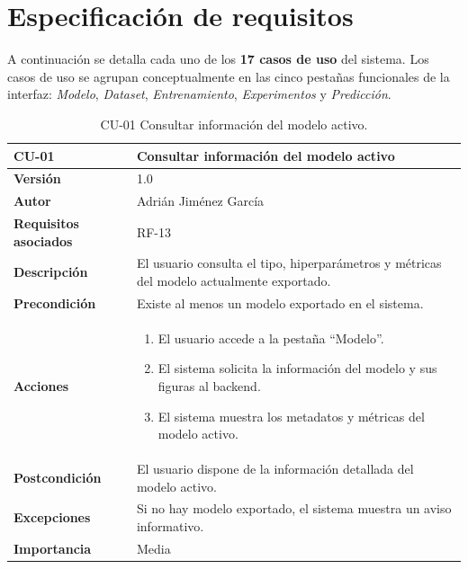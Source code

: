 \section{Especificación de requisitos}

A continuación se detalla cada uno de los \textbf{17 casos de uso} del sistema. Los casos de uso se agrupan conceptualmente en las cinco pestañas funcionales de la interfaz: \emph{Modelo}, \emph{Dataset}, \emph{Entrenamiento}, \emph{Experimentos} y \emph{Predicción}.


\begin{table}[p]
	\centering
	\begin{tabularx}{\linewidth}{ p{} X }
		\toprule
		\textbf{CU-01}    & \textbf{Consultar información del modelo activo}\\
		\toprule
		\textbf{Versión}              & 1.0 \\
		\textbf{Autor}                & Adrián Jiménez García \\
		\textbf{Requisitos asociados} & RF-13 \\
		\textbf{Descripción}          & El usuario consulta el tipo, hiperparámetros y métricas del modelo actualmente exportado. \\
		\textbf{Precondición}         & Existe al menos un modelo exportado en el sistema. \\
		\textbf{Acciones}             &
		\begin{enumerate}
			\def\labelenumi{\arabic{enumi}.}
			\tightlist
			\item El usuario accede a la pestaña ``Modelo''.
			\item El sistema solicita la información del modelo y sus figuras al backend.
			\item El sistema muestra los metadatos y métricas del modelo activo.
		\end{enumerate}\\
		\textbf{Postcondición}        & El usuario dispone de la información detallada del modelo activo. \\
		\textbf{Excepciones}          & Si no hay modelo exportado, el sistema muestra un aviso informativo. \\
		\textbf{Importancia}          & Media \\
		\bottomrule
	\end{tabularx}
	\caption{CU-01 Consultar información del modelo activo.}
\end{table}

